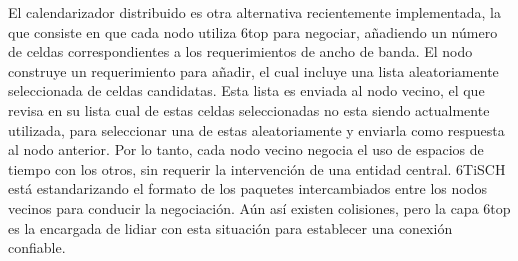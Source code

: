 El calendarizador distribuido es otra alternativa recientemente implementada, la que consiste en que cada nodo utiliza 6top para negociar, añadiendo un número de celdas correspondientes a los requerimientos de ancho de banda. El nodo construye un requerimiento para añadir, el cual incluye una lista aleatoriamente seleccionada de celdas candidatas. Esta lista es enviada al nodo vecino, el que revisa en su lista cual de estas celdas seleccionadas no esta siendo actualmente utilizada, para seleccionar una de estas aleatoriamente y enviarla como respuesta al nodo anterior. Por lo tanto, cada nodo vecino negocia el uso de espacios de tiempo con los otros, sin requerir la intervención de una entidad central. 6TiSCH está estandarizando el formato de los paquetes intercambiados entre los nodos vecinos para conducir la negociación. Aún así existen colisiones, pero la capa 6top es la encargada de lidiar con esta situación para establecer una conexión confiable.
\cite{muraoka2016simple}

